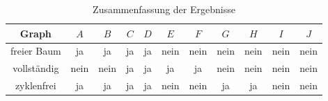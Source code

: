 \documentclass[11pt]{article}
\begin{document}
\begin{table}[h!]
  \centering
  \begin{tabular}{|c|c|c|c|c|c|c|c|c|c|c|}
    \hline
    Graph & $A$ & $B$ & $C$ & $D$ & $E$ & $F$ & $G$ & $H$ & $I$ & $J$ \\
    \hline
    freier Baum & ja & ja & ja & ja & nein & nein & nein & nein & nein & nein \\
    \hline
    vollständig & nein & nein & ja & ja & ja & ja & nein & nein & nein & nein \\
    \hline
    zyklenfrei & ja & ja & ja & ja & nein & nein & ja & ja & nein & nein \\
    \hline
  \end{tabular}
  \caption{Zusammenfassung der Ergebnisse}
  \label{tab:table_a2}
\end{table}

\newpage
\end{document}

